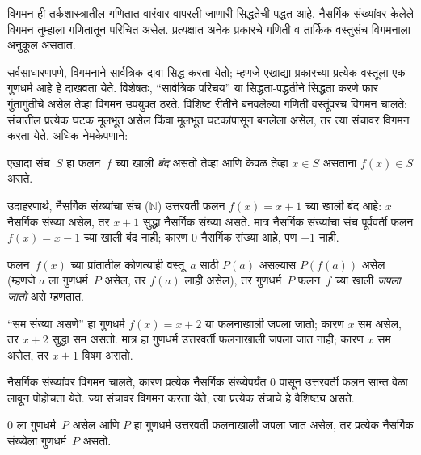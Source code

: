 \documentclass[../../include/open-logic-section]{subfiles}
\begin{document}


\begin{explain}
विगमन ही तर्कशास्त्रातील गणितात वारंवार वापरली जाणारी
सिद्धतेची पद्धत आहे. नैसर्गिक संख्यांवर केलेले विगमन
तुम्हाला गणितातून परिचित असेल. प्रत्यक्षात अनेक प्रकारचे
गणिती व तार्किक वस्तुसंच विगमनाला अनुकूल असतात.

सर्वसाधारणपणे, विगमनाने सार्वत्रिक दावा सिद्ध करता येतो;
म्हणजे एखाद्या प्रकारच्या प्रत्येक वस्तूला एक गुणधर्म आहे हे
दाखवता येते. विशेषतः, “सार्वत्रिक परिचय” या सिद्धता-पद्धतीने
सिद्धता करणे फार गुंतागुंतीचे असेल तेव्हा विगमन उपयुक्त ठरते.
विशिष्ट रीतीने बनवलेल्या गणिती वस्तूंवरच विगमन चालते:
संचातील प्रत्येक घटक मूलभूत असेल किंवा मूलभूत घटकांपासून
बनलेला असेल, तर त्या संचावर विगमन करता येते. अधिक नेमकेपणाने:
\end{explain}

\begin{defn}
एखादा संच~$S$ हा फलन~$f$ च्या खाली \emph{बंद} असतो तेव्हा
आणि केवळ तेव्हा $x \in
S$ असताना $f(x) \in S$ असते.
\end{defn}

\begin{explain}
उदाहरणार्थ, नैसर्गिक संख्यांचा संच ($\mathbb{N}$) उत्तरवर्ती
फलन $f(x) = x+1$ च्या खाली बंद आहे: $x$ नैसर्गिक संख्या
असेल, तर $x+1$ सुद्धा नैसर्गिक संख्या असते. मात्र नैसर्गिक
संख्यांचा संच पूर्ववर्ती फलन $f(x) = x-1$ च्या खाली बंद
नाही; कारण $0$ नैसर्गिक संख्या आहे, पण $-1$ नाही.
\end{explain}

\begin{defn}
फलन~$f(x)$ च्या प्रांतातील कोणत्याही वस्तू~$a$ साठी $P(a)$
असल्यास $P(f(a))$ असेल (म्हणजे $a$ ला गुणधर्म~$P$ असेल,
तर $f(a)$ लाही असेल), तर गुणधर्म~$P$ फलन~$f$ च्या खाली
\emph{जपला जातो} असे म्हणतात.
\end{defn}

\begin{explain}
“सम संख्या असणे” हा गुणधर्म $f(x) = x+2$ या फलनाखाली
जपला जातो; कारण $x$ सम असेल, तर $x+2$ सुद्धा सम असतो.
मात्र हा गुणधर्म उत्तरवर्ती फलनाखाली जपला जात नाही;
कारण $x$ सम असेल, तर $x+1$ विषम असतो.

नैसर्गिक संख्यांवर विगमन चालते, कारण प्रत्येक नैसर्गिक
संख्येपर्यंत 0 पासून उत्तरवर्ती फलन सान्त वेळा लावून
पोहोचता येते. ज्या संचावर विगमन करता येते, त्या प्रत्येक
संचाचे हे वैशिष्ट्य असते.
\end{explain}

\begin{defn}
0 ला गुणधर्म~$P$ असेल आणि $P$ हा गुणधर्म उत्तरवर्ती
फलनाखाली जपला जात असेल, तर प्रत्येक नैसर्गिक संख्येला
गुणधर्म~$P$ असतो.
\end{defn}
\end{document}
